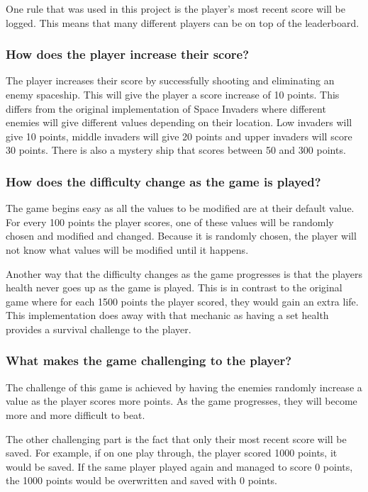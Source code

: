 \documentclass[12pt]{article}
\begin{document}
One rule that was used in this project is the player's most recent score will be logged. This means that many different players can be on top of the leaderboard.

\subsubsection{How does the player increase their score?}
The player increases their score by successfully shooting and eliminating an enemy spaceship. This will give the player a score increase of 10 points. This differs from the original implementation of Space Invaders where different enemies will give different values depending on their location. Low invaders will give 10 points, middle invaders will give 20 points and upper invaders will score 30 points. There is also a mystery ship that scores between 50 and 300 points.

\subsubsection{How does the difficulty change as the game is played?} 
The game begins easy as all the values to be modified are at their default value. For every 100 points the player scores, one of these values will be randomly chosen and modified and changed. Because it is randomly chosen, the player will not know what values will be modified until it happens.

Another way that the difficulty changes as the game progresses is that the players health never goes up as the game is played. This is in contrast to the original game where for each 1500 points the player scored, they would gain an extra life. This implementation does away with that mechanic as having a set health provides a survival challenge to the player. 

\subsubsection{What makes the game challenging to the player?}
The challenge of this game is achieved by having the enemies randomly increase a value as the player scores more points. As the game progresses, they will become more and more difficult to beat. 

The other challenging part is the fact that only their most recent score will be saved. For example, if on one play through, the player scored 1000 points, it would be saved. If the same player played again and managed to score 0 points, the 1000 points would be overwritten and saved with 0 points.  
\end{document}
